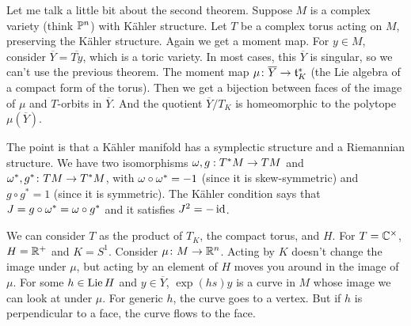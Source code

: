 Let me talk a little bit about the second theorem. Suppose $M$ is a complex variety (think $\mathbb{P}^n$) with K\"ahler structure. Let $T$ be a complex torus acting on $M$, preserving the K\"ahler structure. Again we get a moment map. For $y\in M$, consider $\overline Y=\overline{Ty}$, which is a toric variety. In most cases, this $\overline Y$ is singular, so we can't use the previous theorem. The moment map $\mu\colon \overline{Y}\to \mathfrak{t}_K^*$ (the Lie algebra of a compact form of the torus). Then we get a bijection between faces of the image of $\mu$ and $T$-orbits in $\overline Y$. And the quotient $\overline Y/T_K$ is homeomorphic to the polytope $\mu(\overline Y)$.

The point is that a K\"ahler manifold has a symplectic structure and a Riemannian structure. We have two isomorphisms $\omega,g:T^*M\to TM$ and $\omega^*,g^*\colon TM\to T^*M$, with $\omega\circ \omega^*=-1$ (since it is skew-symmetric) and $g\circ g^*=1$ (since it is symmetric). The K\"ahler condition says that $J=g\circ \omega^*=\omega\circ g^*$ and it satisfies $J^2=-\operatorname{id}$.

We can consider $T$ as the product of $T_K$, the compact torus, and $H$. For $T=\mathbb{C}^\times$, $H=\mathbb{R}^+$ and $K=S^1$. Consider $\mu\colon M\to \mathbb{R}^n$. Acting by $K$ doesn't change the image under $\mu$, but acting by an element of $H$ moves you around in the image of $\mu$. For some $h\in \operatorname{Lie} H$ and $y\in \overline Y$, $\exp(hs)y$ is a curve in $M$ whose image we can look at under $\mu$. For generic $h$, the curve goes to a vertex. But if $h$ is perpendicular to a face, the curve flows to the face.